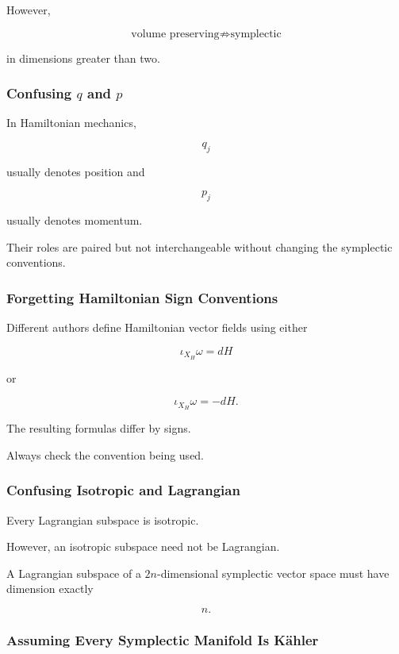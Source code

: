 However,

\[
\boxed{
\text{volume preserving}
\not\Longrightarrow
\text{symplectic}
}
\]

in dimensions greater than two.

\subsubsection{Confusing \(q\) and \(p\)}

In Hamiltonian mechanics,

\[
q_j
\]

usually denotes position and

\[
p_j
\]

usually denotes momentum.

Their roles are paired but not interchangeable without changing the
symplectic conventions.

\subsubsection{Forgetting Hamiltonian Sign Conventions}

Different authors define Hamiltonian vector fields using either

\[
\iota_{X_H}\omega=dH
\]

or

\[
\iota_{X_H}\omega=-dH.
\]

The resulting formulas differ by signs.

Always check the convention being used.

\subsubsection{Confusing Isotropic and Lagrangian}

Every Lagrangian subspace is isotropic.

However, an isotropic subspace need not be Lagrangian.

A Lagrangian subspace of a \(2n\)-dimensional symplectic vector space must
have dimension exactly

\[
\boxed{n.}
\]

\subsubsection{Assuming Every Symplectic Manifold Is K\"ahler}


